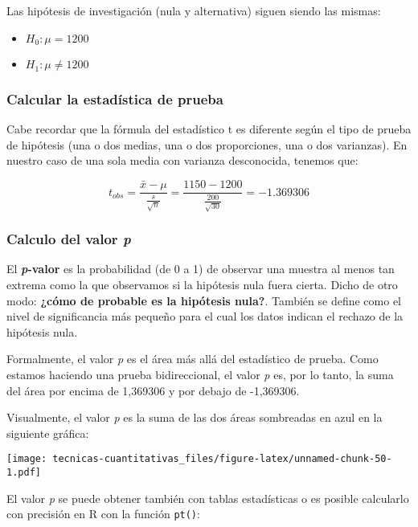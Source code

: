 \documentclass[
]{book}
\providecommand{\tightlist}{%
  \setlength{\itemsep}{0pt}\setlength{\parskip}{0pt}}
\begin{document}
Las hipótesis de investigación (nula y alternativa) siguen siendo las mismas:

\begin{itemize}
\tightlist
\item
  \(H_0:\mu= 1200\)
\item
  \(H_1:\mu\ne 1200\)
\end{itemize}

\hypertarget{calcular-la-estaduxedstica-de-prueba-1}{%
\subsubsection{Calcular la estadística de prueba}\label{calcular-la-estaduxedstica-de-prueba-1}}

Cabe recordar que la fórmula del estadístico t es diferente según el tipo de prueba de hipótesis (una o dos medias, una o dos proporciones, una o dos varianzas). En nuestro caso de una sola media con varianza desconocida, tenemos que:

\[t_{obs} = \frac{\bar{x} - \mu}{\frac{s}{\sqrt{n}}} = \frac{1150 - 1200}{\frac{200}{\sqrt{30}}} = -1.369306\]

\hypertarget{calculo-del-valor-p}{%
\subsubsection{\texorpdfstring{Calculo del valor \emph{p}}{Calculo del valor p}}\label{calculo-del-valor-p}}

El \textbf{\emph{p}-valor} es la probabilidad (de 0 a 1) de observar una muestra al menos tan extrema como la que observamos si la hipótesis nula fuera cierta. Dicho de otro modo: \textbf{¿cómo de probable es la hipótesis nula?}. También se define como el nivel de significancia más pequeño para el cual los datos indican el rechazo de la hipótesis nula.

Formalmente, el valor \emph{p} es el área más allá del estadístico de prueba. Como estamos haciendo una prueba bidireccional, el valor \emph{p} es, por lo tanto, la suma del área por encima de 1,369306 y por debajo de -1,369306.

Visualmente, el valor \emph{p} es la suma de las dos áreas sombreadas en azul en la siguiente gráfica:

\texttt{[image: tecnicas-cuantitativas\_files/figure-latex/unnamed-chunk-50-1.pdf]}

El valor \emph{p} se puede obtener también con tablas estadísticas o es posible calcularlo con precisión en R con la función \texttt{pt()}:
\end{document}
